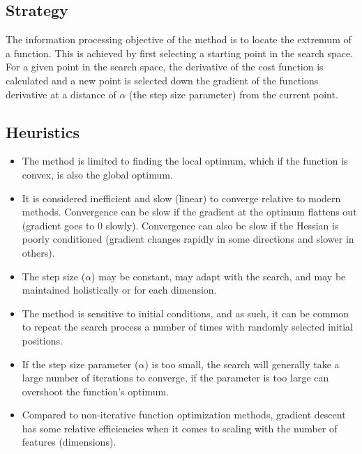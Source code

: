 \subsection{Strategy}
The information processing objective of the method is to locate the extremum of a function.
This is achieved by first selecting a starting point in the search space. For a given point in the search space, the derivative of the cost function is calculated and a new point is selected down the gradient of the functions derivative at a distance of $\alpha$ (the step size parameter) from the current point. 

\subsection{Heuristics}

\begin{itemize}
	\item The method is limited to finding the local optimum, which if the function is convex, is also the global optimum.
	\item It is considered inefficient and slow (linear) to converge relative to modern methods. Convergence can be slow if the gradient at the optimum flattens out (gradient goes to 0 slowly). Convergence can also be slow if the Hessian is poorly conditioned (gradient changes rapidly in some directions and slower in others).
	\item The step size ($\alpha$) may be constant, may adapt with the search, and may be maintained holistically or for each dimension.
	\item The method is sensitive to initial conditions, and as such, it can be common to repeat the search process a number of times with randomly selected initial positions.
	\item If the step size parameter ($\alpha$) is too small, the search will generally take a large number of iterations to converge, if the parameter is too large can overshoot the function's optimum.
	\item Compared to non-iterative function optimization methods, gradient descent has some relative efficiencies when it comes to scaling with the number of features (dimensions).
\end{itemize}

